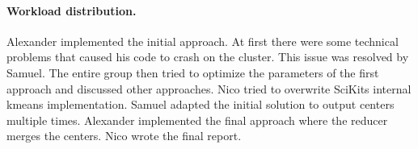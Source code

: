 \documentclass[a4paper, 11pt]{article}
\begin{document}




\paragraph{Workload distribution.\!\!\!}

Alexander implemented the initial approach. At first there were some technical problems that caused his code to crash on the cluster. This issue was
resolved by Samuel. The entire group then tried to optimize the parameters of the first approach and discussed other approaches. Nico tried to overwrite 
SciKits internal kmeans implementation. Samuel adapted the initial solution to output centers multiple times. 
Alexander implemented the final approach where the reducer merges the centers. Nico wrote the final report.



\end{document}
